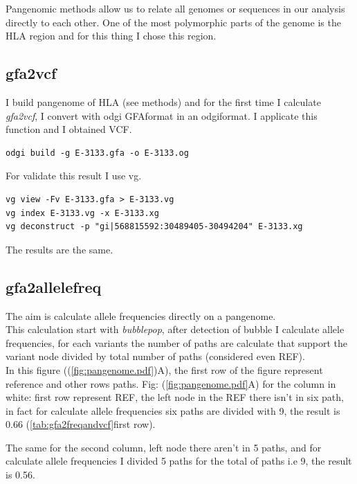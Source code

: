 Pangenomic methods allow us to relate all genomes or sequences in our analysis directly to each other. One of the most polymorphic parts of the genome is the HLA region and for this thing I chose this region.

\subsection{gfa2vcf}

I build pangenome of HLA (see methods) and for the first time I calculate \textit{gfa2vcf}, I convert with odgi GFAformat in an odgiformat. I applicate this function and I obtained VCF.

\begin{verbatim}
odgi build -g E-3133.gfa -o E-3133.og
\end{verbatim}

For validate this result I use vg.
\begin{verbatim}
vg view -Fv E-3133.gfa > E-3133.vg
vg index E-3133.vg -x E-3133.xg
vg deconstruct -p "gi|568815592:30489405-30494204" E-3133.xg
\end{verbatim}

The results are the same.

\subsection{gfa2allelefreq}

The aim is calculate allele frequencies directly on a pangenome. \\

This calculation start with \textit{bubblepop}, after detection of  bubble I calculate allele frequencies, for each variants the number of paths are calculate that support the variant node divided by total number of paths (considered even REF).\\

In this figure ((\ref{fig:pangenome.pdf})A), the first row of the figure represent reference and other rows paths.
Fig: (\ref{fig:pangenome.pdf}A)  for the column in white: first row represent REF, the left node in the REF there isn't in six path, in fact for calculate allele frequencies six paths are divided with 9, the result is 0.66 (\ref{tab:gfa2freqandvcf}first row).


The same for the second column, left node there aren't in 5 paths, and for calculate allele frequencies I divided 5 paths for the total of paths i.e  9, the result is 0.56.


